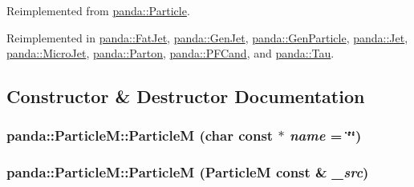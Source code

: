 Reimplemented from \hyperlink{classpanda_1_1Particle_a5c7d779f6db770bcc94cfe63c42b59d2}{panda::Particle}.

Reimplemented in \hyperlink{classpanda_1_1FatJet_a2740a440685d1d581f92bcedbf1a6f9e}{panda::FatJet}, \hyperlink{classpanda_1_1GenJet_adf2446e9cb42ccd9a7b2e790d674965a}{panda::GenJet}, \hyperlink{classpanda_1_1GenParticle_a2f1d232f5f5660f0c147145d280df831}{panda::GenParticle}, \hyperlink{classpanda_1_1Jet_abc4f1b55581c1f9a65d14ca360458c40}{panda::Jet}, \hyperlink{classpanda_1_1MicroJet_a07385bfbc6560036a2f568b073183df9}{panda::MicroJet}, \hyperlink{classpanda_1_1Parton_adced932b94de43884831c4685e542518}{panda::Parton}, \hyperlink{classpanda_1_1PFCand_a6f3fdf6ad51952f9995adb1111fec3bc}{panda::PFCand}, and \hyperlink{classpanda_1_1Tau_a4998ea28667acf331fa5dd9e9decdcda}{panda::Tau}.

\subsection{Constructor \& Destructor Documentation}
\hypertarget{classpanda_1_1ParticleM_af77a2005ee7665cbc507121351f0fa8a}{
\subsubsection[{ParticleM}]{\setlength{\rightskip}{0pt plus 5cm}panda::ParticleM::ParticleM (char const $\ast$ {\em name} = {\ttfamily \char`\"{}\char`\"{}})}}
\label{classpanda_1_1ParticleM_af77a2005ee7665cbc507121351f0fa8a}
\hypertarget{classpanda_1_1ParticleM_ad0b7348a6d2f24df6f9abac2f5d86a64}{
\subsubsection[{ParticleM}]{\setlength{\rightskip}{0pt plus 5cm}panda::ParticleM::ParticleM ({\bf ParticleM} const \& {\em \_\-src})}}
\label{classpanda_1_1ParticleM_ad0b7348a6d2f24df6f9abac2f5d86a64}



